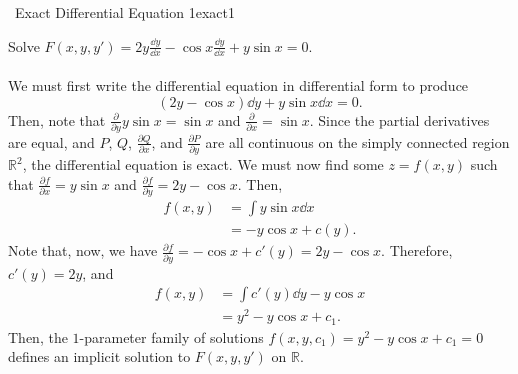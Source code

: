         \begin{example}{\Difficulty\,\Difficulty\,\,Exact Differential Equation 1}{exact1}

            Solve \(F(x,y,y')=2y\frac{\dd y}{\dd x}-\cos x\frac{\dd y}{\dd x}+y\sin x=0\).
            \\
            \\
            We must first write the differential equation in differential form to produce
            \begin{equation*}
                (2y-\cos x)\dd y+y\sin x\dd x=0.
            \end{equation*}
            Then, note that \(\frac{\partial}{\partial y}y\sin x=\sin x\) and \(\frac{\partial}{\partial x}=\sin x\). Since the partial derivatives are equal, and \(P\), \(Q\), \(\frac{\partial Q}{\partial x}\), and \(\frac{\partial P}{\partial y}\) are all continuous on the simply connected region \(\mathbb{R}^2\), the differential equation is exact. We must now find some \(z=f(x,y)\) such that \(\frac{\partial f}{\partial x}=y\sin x\) and \(\frac{\partial f}{\partial y}=2y-\cos x\). Then,
            \begin{align*}
                f(x,y)&=\int y\sin x\dd x \\
                &=-y\cos x+c(y).
            \end{align*}
            Note that, now, we have \(\frac{\partial f}{\partial y}=-\cos x+c'(y)=2y-\cos x\). Therefore, \(c'(y)=2y\), and
            \begin{align*}
                f(x,y)&=\int c'(y)\dd y-y\cos x \\
                &=y^2-y\cos x+c_1.
            \end{align*}
            Then, the \(1\)-parameter family of solutions \(f(x,y,c_1)=y^2-y\cos x+c_1=0\) defines an implicit solution to \(F(x,y,y')\) on \(\mathbb{R}\).
        \end{example}